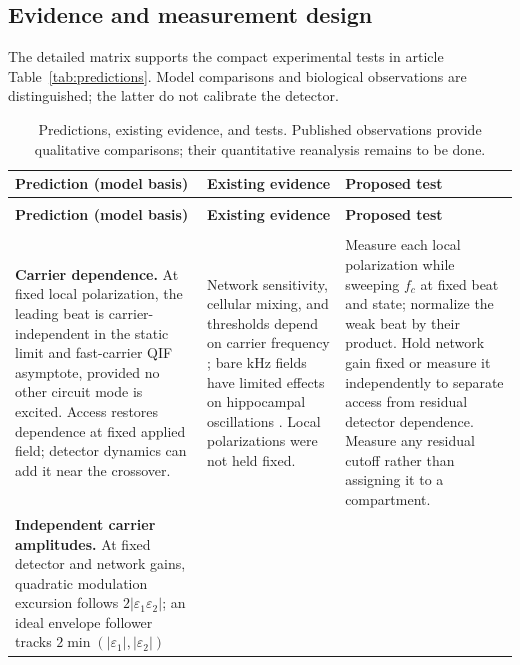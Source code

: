 \documentclass[11pt,a4paper]{article}
\begin{document}
\subsection{Evidence and measurement design}\label{supp:prediction-evidence}
The detailed matrix supports the compact experimental tests in article
Table~\ref{tab:predictions}. Model comparisons and biological observations
are distinguished; the latter do not calibrate the detector.
\begingroup\small
\renewcommand{\arraystretch}{1.15}
\begin{longtable}{@{}>{\raggedright\arraybackslash}p{}
 >{\raggedright\arraybackslash}p{}
 >{\raggedright\arraybackslash}p{}@{}}
\caption{Predictions, existing evidence, and tests. Published observations provide
qualitative comparisons; their quantitative reanalysis remains to be done.}
\label{tab:prediction-evidence}\\
\toprule
\textbf{Prediction (model basis)} & \textbf{Existing evidence} & \textbf{Proposed test} \\
\midrule\endfirsthead
\multicolumn{3}{@{}l}{\textit{Table \thetable\ continued}}\\
\toprule
\textbf{Prediction (model basis)} & \textbf{Existing evidence} & \textbf{Proposed test} \\
\midrule\endhead
\midrule\multicolumn{3}{r@{}}{\textit{Continued on next page}}\\\endfoot
\bottomrule\endlastfoot
\textbf{Carrier dependence.} At fixed local polarization, the leading beat is
carrier-independent in the static limit and fast-carrier QIF asymptote, provided
no other circuit mode is excited. Access restores dependence at fixed applied
field; detector dynamics can add it near the crossover.
& Network sensitivity, cellular mixing, and thresholds depend on carrier frequency
\cite{esmaeilpour2021,luff2024mixer,opancar2025,peripheral2023}; bare kHz fields
have limited effects on hippocampal oscillations \cite{esmaeilpour2020}.
Local polarizations were not held fixed.
& Measure each local polarization while sweeping $f_c$ at fixed beat and state;
normalize the weak beat by their product. Hold network gain fixed or measure it
independently to separate access from residual detector dependence. Measure any
residual cutoff rather than assigning it to a compartment. \\[4pt]
\textbf{Independent carrier amplitudes.} At fixed detector and network gains,
quadratic modulation excursion follows $2|\varepsilon_1\varepsilon_2|$;
an ideal envelope follower tracks $2\min(|\varepsilon_1|,|\varepsilon_2|)$

\end{longtable}
\end{document}
